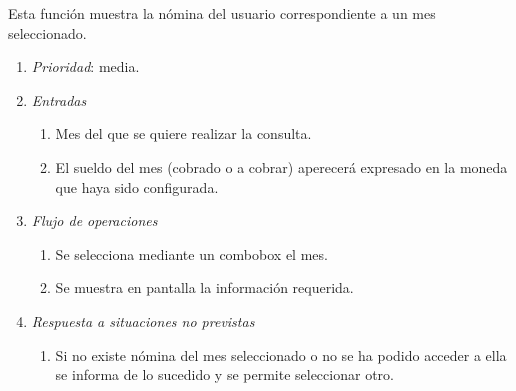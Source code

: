 	Esta función muestra la nómina del usuario correspondiente a un mes seleccionado.

\begin{enumerate}
	\item \textit{Prioridad}: media.
	\item \textit{Entradas}
	\begin{enumerate}
		\item Mes del que se quiere realizar la consulta.
		\item El sueldo del mes (cobrado o a cobrar) aperecerá expresado en la moneda que haya sido configurada.
	\end{enumerate}
	\item \textit{Flujo de operaciones}
	\begin{enumerate}
		\item Se selecciona mediante un \gls{combobox} el mes.
		\item Se muestra en pantalla la información requerida.
	\end{enumerate}
	\item \textit{Respuesta a situaciones no previstas}
	\begin{enumerate}
		\item Si no existe nómina del mes seleccionado o no se ha podido acceder a ella se informa de lo sucedido y se permite seleccionar otro.
	\end{enumerate}
\end{enumerate}	
